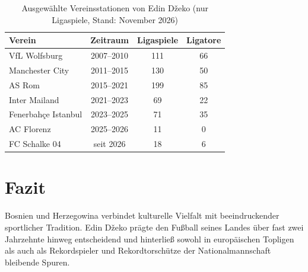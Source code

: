 \documentclass[a4paper, 12pt]{article}
\begin{document}
\begin{table}[htbp]
    \centering
    \caption{Ausgewählte Vereinsstationen von Edin D\v{z}eko (nur Ligaspiele, Stand: November 2026)}
    \label{tab:vereine}
    \begin{tabular}{lccc}
        \toprule
        Verein & Zeitraum & Ligaspiele & Ligatore \\
        \midrule
        VfL Wolfsburg & 2007--2010 & 111 & 66 \\
        Manchester City & 2011--2015 & 130 & 50 \\
        AS Rom & 2015--2021 & 199 & 85 \\
        Inter Mailand & 2021--2023 & 69 & 22 \\
        Fenerbah\c{c}e Istanbul & 2023--2025 & 71 & 35 \\
        AC Florenz & 2025--2026 & 11 & 0 \\
        FC Schalke 04 & seit 2026 & 18 & 6 \\
        \bottomrule
    \end{tabular}
\end{table}

\section{Fazit}
Bosnien und Herzegowina verbindet kulturelle Vielfalt mit beeindruckender sportlicher Tradition. Edin D\v{z}eko prägte den Fußball seines Landes über fast zwei Jahrzehnte hinweg entscheidend und hinterließ sowohl in europäischen Topligen als auch als Rekordspieler und Rekordtorschütze der Nationalmannschaft bleibende Spuren.

\printbibliography
\end{document}

